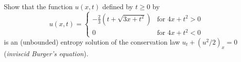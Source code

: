 \begin{problem}
  Show that the function \(u(x,t)\) defined by \(t\geq 0\) by
  \[
    u(x,t)=
    \begin{cases}
      \displaystyle-\frac{2}{3}\left(t+\sqrt{3x+t^2}\right)
      &\text{for \(4x+t^2>0\)}\\
      0
      &\text{for \(4x+t^2<0\)}
    \end{cases}
  \]
  is an (unbounded) entropy solution of the conservation law
  \(u_t+(u^2/2)_x=0\) (\emph{inviscid Burger's equation}).
\end{problem}
\begin{solution}
\end{solution}

